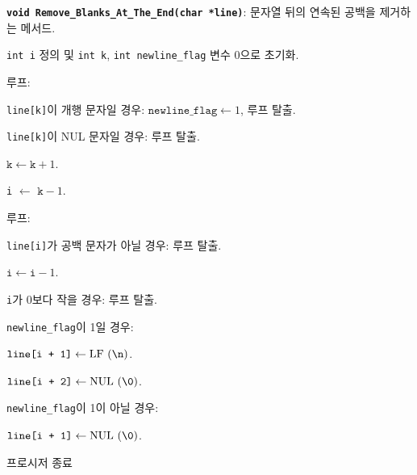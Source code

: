 \textbf{\texttt{void Remove_Blanks_At_The_End(char *line)}}: 문자열 뒤의 연속된 공백을 제거하는 메서드.
\begin{algorithm}
	\item \texttt{int i} 정의 및 \texttt{int k}, \texttt{int newline_flag} 변수 0으로 초기화.	
	\item 루프:
			\begin{algorithm}
				\item \texttt{line[k]}이 개행 문자일 경우: $\texttt{newline_flag} \leftarrow 1$, 루프 탈출.
				\item \texttt{line[k]}이 NUL 문자일 경우: 루프 탈출.
				\item $\texttt{k} \leftarrow \texttt{k} + 1$.
			\end{algorithm} 
	\item \texttt{i} $\leftarrow$ $\texttt{k} - 1$.
	\item 루프:
			\begin{algorithm}
				\item \texttt{line[i]}가 공백 문자가 아닐 경우: 루프 탈출.
				\item $\texttt{i} \leftarrow \texttt{i} - 1$.
				\item \texttt{i}가 0보다 작을 경우: 루프 탈출.
			\end{algorithm}
	\item \texttt{newline_flag}이 1일 경우:
			\begin{algorithm}
				\item $\texttt{line[i + 1]} \leftarrow \textrm{LF (\texttt{\textbackslash{}n})}$.
				\item $\texttt{line[i + 2]} \leftarrow \textrm{NUL (\texttt{\textbackslash{}0})}$.
			\end{algorithm}
	\item \texttt{newline_flag}이 1이 아닐 경우:
			\begin{algorithm}
				\item $\texttt{line[i + 1]} \leftarrow \textrm{NUL (\texttt{\textbackslash{}0})}$.
			\end{algorithm}
	\item 프로시저 종료
\end{algorithm}


